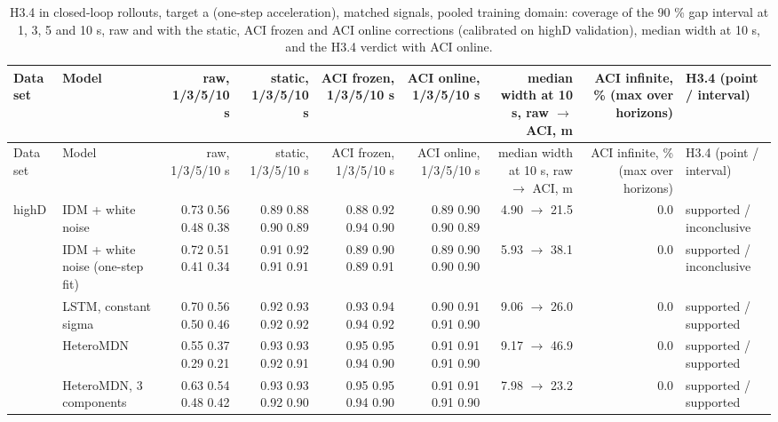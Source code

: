 \begingroup
\footnotesize
\begin{longtable}{llrrrrrrl}
\caption{H3.4 in closed-loop rollouts, target a (one-step acceleration), matched signals, pooled training domain: coverage of the 90 \% gap interval at 1, 3, 5 and 10 s, raw and with the static, ACI frozen and ACI online corrections (calibrated on highD validation), median width at 10 s, and the H3.4 verdict with ACI online.}\label{tab:t4-coverage--pool--a} \\
\toprule
Data set & Model & raw, 1/3/5/10 s & static, 1/3/5/10 s & ACI frozen, 1/3/5/10 s & ACI online, 1/3/5/10 s & median width at 10 s, raw $\rightarrow$ ACI, m & ACI infinite, \% (max over horizons) & H3.4 (point / interval) \\
\midrule
\endfirsthead
\toprule
Data set & Model & raw, 1/3/5/10 s & static, 1/3/5/10 s & ACI frozen, 1/3/5/10 s & ACI online, 1/3/5/10 s & median width at 10 s, raw $\rightarrow$ ACI, m & ACI infinite, \% (max over horizons) & H3.4 (point / interval) \\
\midrule
\endhead
\bottomrule
\endlastfoot
highD & IDM + white noise & 0.73 0.56 0.48 0.38 & 0.89 0.88 0.90 0.89 & 0.88 0.92 0.94 0.90 & 0.89 0.90 0.90 0.89 & 4.90 $\rightarrow$ 21.5 & 0.0 & supported / inconclusive \\
 & IDM + white noise (one-step fit) & 0.72 0.51 0.41 0.34 & 0.91 0.92 0.91 0.91 & 0.89 0.90 0.89 0.91 & 0.89 0.90 0.90 0.90 & 5.93 $\rightarrow$ 38.1 & 0.0 & supported / inconclusive \\
 & LSTM, constant sigma & 0.70 0.56 0.50 0.46 & 0.92 0.93 0.92 0.92 & 0.93 0.94 0.94 0.92 & 0.90 0.91 0.91 0.90 & 9.06 $\rightarrow$ 26.0 & 0.0 & supported / supported \\
 & HeteroMDN & 0.55 0.37 0.29 0.21 & 0.93 0.93 0.92 0.91 & 0.95 0.95 0.94 0.90 & 0.91 0.91 0.91 0.90 & 9.17 $\rightarrow$ 46.9 & 0.0 & supported / supported \\
 & HeteroMDN, 3 components & 0.63 0.54 0.48 0.42 & 0.93 0.93 0.92 0.90 & 0.95 0.95 0.94 0.90 & 0.91 0.91 0.91 0.90 & 7.98 $\rightarrow$ 23.2 & 0.0 & supported / supported \\

\end{longtable}
